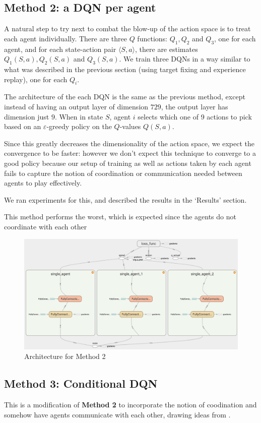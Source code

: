 \documentclass{article}
\begin{document}
\subsection{Method 2: a DQN per agent}
A natural step to try next to combat the blow-up
of the action space is to treat each agent
individually. There are three $Q$ functions:
$Q_1, Q_2$ and $Q_3$, one for each agent, and
for each state-action pair $\langle S,a\rangle$,
there are estimates $Q_1(S,a),Q_2(S,a)$ and
$Q_3(S,a)$. We train three DQNs in a way similar
to what was described in the previous section
(using target fixing and experience replay), one for
each $Q_i$.

The architecture of the each DQN is the same as the
previous method, except instead of having an output
layer of dimension $729$, the output layer has dimension
just $9$. When in state $S$, agent $i$ selects which one
of 9 actions to pick based on an $\varepsilon$-greedy policy
on the $Q$-values $Q(S,a)$.

Since this greatly decreases the dimensionality of
the action space, we expect the convergence to be
faster: however we don't expect this technique to
converge to a good policy because our setup
of training as well as actions taken by each agent
fails to capture the notion of coordination or
communication needed between agents to play effectively.

We ran experiments for this, and described the results in
the `Results' section.

This method performs the worst, which is expected since the
agents do not coordinate with each other 

\begin{figure}[H]
\centering
\includegraphics[scale=0.15]{parallel.png}
\caption{Architecture for Method 2}
\end{figure}

\subsection{Method 3: Conditional DQN}
This is a modification of \textbf{Method 2} to incorporate
the notion of coodination and somehow have agents communicate
with each other, drawing ideas from \cite{foerster2016learning}.
\end{document}
